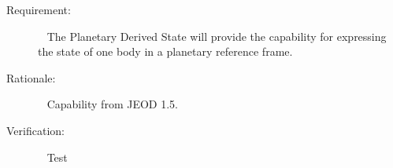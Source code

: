 
%
%
% 
%

\label{reqt:Planetary}
\begin{description}
  \item[Requirement:]\ \newline
     The Planetary Derived State will provide the capability for expressing the state of one body in a planetary reference frame.
  \item[Rationale:]\ \newline
     Capability from JEOD 1.5.
  \item[Verification:]\ \newline
     Test
\end{description}


